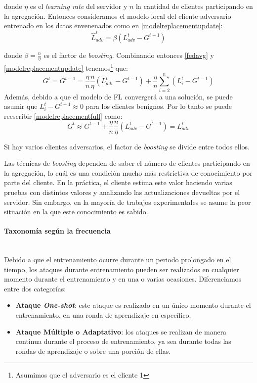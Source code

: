 donde $\eta$ es el \textit{learning rate} del servidor y $n$ la cantidad de clientes participando en la agregación. Entonces consideramos el modelo local del cliente adversario entrenado en los datos envenenados como en \eqref{modelreplacementupdate}:
\begin{equation}\label{modelreplacementupdate}
    \hat{L}^t_{adv} = \beta(L^t_{adv} - G^{t-1})
\end{equation}

donde $\beta=\frac{n}{\eta}$ es el factor de \textit{boosting}. Combinando entonces \eqref{fedavg} y \eqref{modelreplacementupdate} tenemos\footnote{Asumimos que el adversario es el cliente 1} que:
\begin{equation}\label{modelreplacementfull}
    G^t = G^{t-1} = \frac{\eta}{n}\frac{n}{\eta}(L^t_{adv} - G^{t-1}) + \frac{\eta}{n}\sum_{i=2}^n(L^t_i - G^{t-1})
\end{equation}
Además, debido a que el modelo de \ac{FL} convergerá a una solución, se puede asumir que $L^t_i - G^{t-1} \approx 0$ para los clientes benignos. Por lo tanto se puede reescribir \eqref{modelreplacementfull} como:
\begin{equation}
    G^t \approx G^{t-1} + \frac{\eta}{n}\frac{n}{\eta}(L^t_{adv} - G^{t-1}) = L^t_{adv}
\end{equation}

Si hay varios clientes adversarios, el factor de \textit{boosting} se divide entre todos ellos.

Las técnicas de \textit{boosting} dependen de saber el número de clientes participando en la agregación, lo cuál es una condición mucho más restrictiva de conocimiento por parte del cliente. En la práctica, el cliente estima este valor haciendo varias pruebas con distintos valores y analizando las actualizaciones devueltas por el servidor. Sin embargo, en la mayoría de trabajos experimentales se asume la peor situación en la que este conocimiento es sabido.

\paragraph{Taxonomía según la frecuencia}\mbox{}\\

Debido a que el entrenamiento ocurre durante un periodo prolongado en el tiempo, los ataques durante entrenamiento pueden ser realizados en cualquier momento durante el entrenamiento y en una o varias ocasiones. Diferenciamos entre dos categorías:
\begin{itemize}
    \item \textbf{Ataque \textit{One-shot}}: este ataque es realizado en un único momento durante el entrenamiento, en una ronda de aprendizaje en específico.
    \item \textbf{Ataque Múltiple o Adaptativo}: los ataques se realizan de manera continua durante el proceso de entrenamiento, ya sea durante todas las rondas de aprendizaje o sobre una porción de ellas.
\end{itemize}

